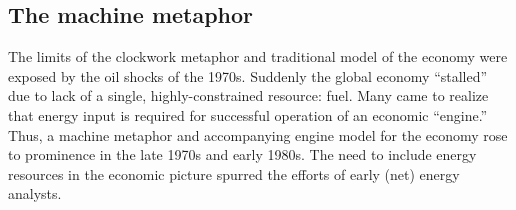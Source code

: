 \subsection{The machine metaphor}
\label{sec:machine_metaphor}



%
%


The limits of the clockwork metaphor and traditional model of the economy were 
exposed by the oil shocks of the 1970s.
Suddenly the global economy
``stalled'' due to lack of 
a single, highly-constrained resource:
fuel.
Many came to realize that energy input is required
for successful operation of an economic ``engine.''
Thus, a machine metaphor and 
accompanying engine model for the economy 
rose to prominence
in the late 1970s and early 1980s.
The need to include energy resources
in the economic picture
spurred the efforts of early (net) energy 
analysts.\cite{Gilliland1975, Chapman1976}

